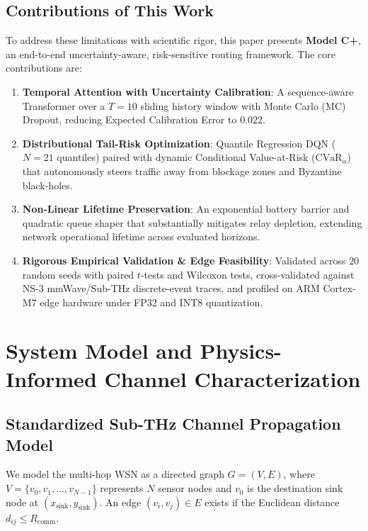 \documentclass[conference]{IEEEtran}
\begin{document}
\subsection{Contributions of This Work}
To address these limitations with scientific rigor, this paper presents \textbf{Model C+}, an end-to-end uncertainty-aware, risk-sensitive routing framework. The core contributions are:
\begin{enumerate}
    \item \textbf{Temporal Attention with Uncertainty Calibration}: A sequence-aware Transformer over a $T=10$ sliding history window with Monte Carlo (MC) Dropout, reducing Expected Calibration Error to $0.022$.
    \item \textbf{Distributional Tail-Risk Optimization}: Quantile Regression DQN ($N=21$ quantiles) paired with dynamic Conditional Value-at-Risk ($\text{CVaR}_\alpha$) that autonomously steers traffic away from blockage zones and Byzantine black-holes.
    \item \textbf{Non-Linear Lifetime Preservation}: An exponential battery barrier and quadratic queue shaper that substantially mitigates relay depletion, extending network operational lifetime across evaluated horizons.
    \item \textbf{Rigorous Empirical Validation \& Edge Feasibility}: Validated across 20 random seeds with paired $t$-tests and Wilcoxon tests, cross-validated against NS-3 mmWave/Sub-THz discrete-event traces, and profiled on ARM Cortex-M7 edge hardware under FP32 and INT8 quantization.
\end{enumerate}

\section{System Model and Physics-Informed Channel Characterization}

\subsection{Standardized Sub-THz Channel Propagation Model}
We model the multi-hop WSN as a directed graph $G = (V, E)$, where $V = \{v_0, v_1, \dots, v_{N-1}\}$ represents $N$ sensor nodes and $v_0$ is the destination sink node at $(x_{\text{sink}}, y_{\text{sink}})$. An edge $(v_i, v_j) \in E$ exists if the Euclidean distance $d_{ij} \le R_{\text{comm}}$.
\end{document}
